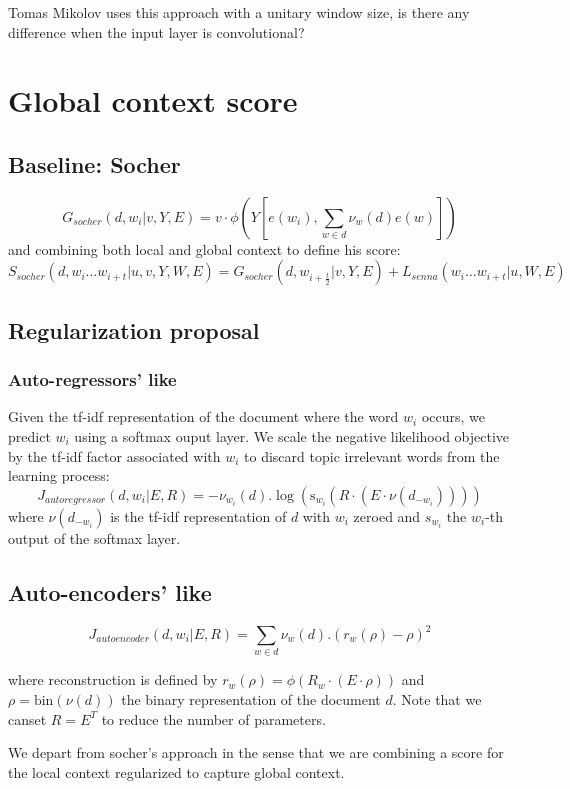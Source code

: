 \documentclass[11pt]{article} %
\begin{document}
Tomas Mikolov uses this approach with a unitary window size, is there any difference when the input layer is convolutional?

\section{Global context score}
\subsection{Baseline: Socher}
\[G_{socher}(d,w_i| v,Y,E) = v \cdot \phi\left(Y\left[e(w_i),\sum_{w\in d} \nu_w (d) e(w) \right] \right) \]
and combining both local and global context to define his score:
\[ S_{socher}(d,w_i\ldots w_{i+t}| u,v,Y,W,E) = G_{socher}(d,w_{i+\frac{t}{2}}| v,Y,E)  + L_{senna} \left(w_i\ldots w_{i+t}  | u,W,E\right) \]

\subsection{Regularization proposal}
\subsubsection{Auto-regressors' like}
Given the tf-idf representation of the document where the word $w_i$ occurs, we predict $w_i$ using a softmax ouput layer. 
We scale the negative likelihood objective by the tf-idf factor associated with $w_i$ to discard topic irrelevant words from the learning process:
\[
J_{autoregressor} (d,w_i|E,R) = -\nu_{w_i}(d) . \log\left( \mathrm{s}_{w_i}\left(R\cdot \left(E \cdot \nu\left(d_{-w_i}\right)\right)\right)\right)
\]
where $\nu\left(d_{-w_i}\right)$ is the tf-idf representation of $d$ with $w_i$ zeroed and $s_{w_i}$ the $w_i$-th output of the softmax layer.
\subsection{Auto-encoders' like}
\[
J_{autoencoder} (d,w_i| E,R) = \sum_{w\in d} \nu_w\left(d\right) . \left( r_w \left( \rho \right) - \rho \right)^2 
\]

where reconstruction is defined by $r_w(\rho) = \phi\left(R_w\cdot\left(E\cdot\rho\right)\right)$ and $\rho = \mathrm{bin}\left(\nu\left(d\right)\right)$ the binary representation of the document $d$. Note that we canset $R=E^T$ to reduce the number of parameters.

We depart from socher's approach in the sense that we are combining a score for the local context regularized to capture global context.
\end{document}
